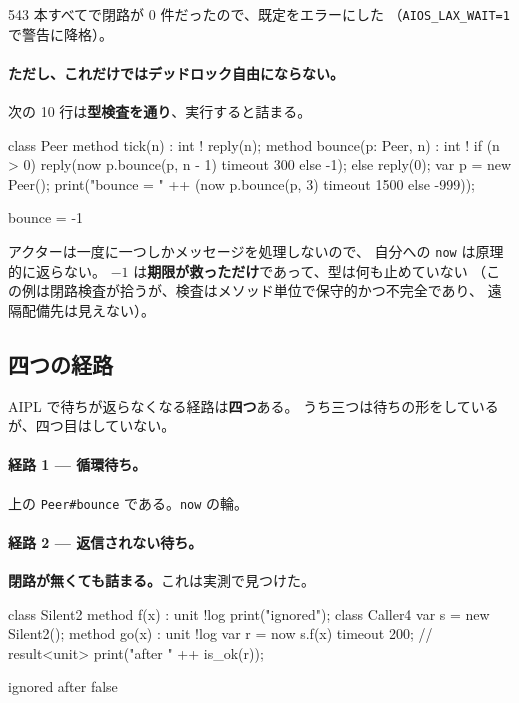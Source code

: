 \documentclass[11pt,a4paper]{ltjsarticle}
\theoremstyle{definition}
\theoremstyle{remark}
\begin{document}
543 本すべてで閉路が 0 件だったので、既定をエラーにした
（\texttt{AIOS\_LAX\_WAIT=1} で警告に降格）。

\paragraph{ただし、これだけではデッドロック自由にならない。}
次の 10 行は\textbf{型検査を通り}、実行すると詰まる。

\begin{aipl}
class Peer {
  method tick(n) : int !{} { reply(n); }
  method bounce(p: Peer, n) : int !{} {
    if (n > 0) { reply(now p.bounce(p, n - 1) timeout 300 else -1); }
    else { reply(0); }
  }
}
var p = new Peer();
print("bounce = " ++ (now p.bounce(p, 3) timeout 1500 else -999));
\end{aipl}
\begin{term}
bounce = -1
\end{term}

アクターは一度に一つしかメッセージを処理しないので、
自分への \texttt{now} は原理的に返らない。
$-1$ は\textbf{期限が救っただけ}であって、型は何も止めていない
（この例は閉路検査が拾うが、検査はメソッド単位で保守的かつ不完全であり、
遠隔配備先は見えない）。

\subsection{四つの経路}
\label{sec:dl3}


AIPL で待ちが返らなくなる経路は\textbf{四つ}ある。
うち三つは待ちの形をしているが、四つ目はしていない。

\paragraph{経路 1 --- 循環待ち。}
上の \texttt{Peer\#bounce} である。\texttt{now} の輪。

\paragraph{経路 2 --- 返信されない待ち。}
\textbf{閉路が無くても詰まる。}これは実測で見つけた。

\begin{aipl}
class Silent2 { method f(x) : unit !{log} { print("ignored"); } }
class Caller4 {
  var s = new Silent2();
  method go(x) : unit !{log} {
    var r = now s.f(x) timeout 200;      // result<unit>
    print("after " ++ is_ok(r));
  }
}
\end{aipl}
\begin{term}
ignored
after false
\end{term}
\end{document}
